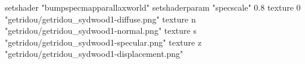 setshader "bumpspecmapparallaxworld"
setshaderparam "specscale" 0.8
texture 0 "getridou/getridou_sydwood1-diffuse.png"
texture n "getridou/getridou_sydwood1-normal.png"
texture s "getridou/getridou_sydwood1-specular.png"
texture z "getridou/getridou_sydwood1-displacement.png"
